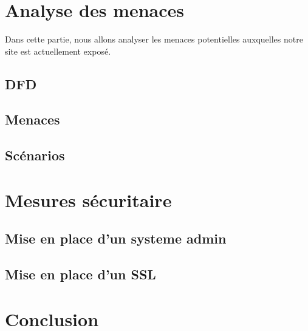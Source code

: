 \documentclass[a4paper]{article}
\begin{document}
\section{Analyse des menaces}
Dans cette partie, nous allons analyser les menaces potentielles auxquelles notre site est actuellement exposé.
\subsection{DFD}
\subsection{Menaces}
\subsection{Scénarios}
\section{Mesures sécuritaire}
\subsection{Mise en place d'un systeme admin}
\subsection{Mise en place d'un SSL}
\section{Conclusion}
\end{document}
